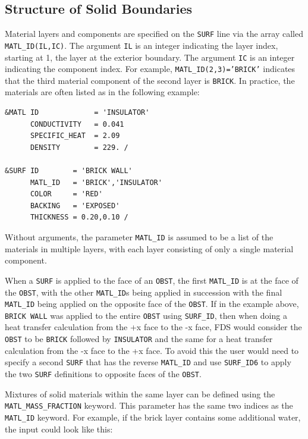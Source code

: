 \documentclass[11pt]{book}
\newcommand{\ct}{\tt\small}
\begin{document}
\subsection{Structure of Solid Boundaries}

Material layers and components are
specified on the {\ct SURF} line via the array called {\ct MATL\_ID(IL,IC)}.
The argument {\ct IL} is an integer indicating the
layer index, starting at 1, the layer at the exterior boundary. The
argument {\ct IC} is an integer indicating the component index. For
example, {\ct MATL\_ID(2,3)='BRICK'} indicates that the third material
component of the second layer is {\ct BRICK}. In practice, the
materials are often listed as in the following example:

\footnotesize
\begin{verbatim}
&MATL ID             = 'INSULATOR'
      CONDUCTIVITY   = 0.041
      SPECIFIC_HEAT  = 2.09
      DENSITY        = 229. /

&SURF ID        = 'BRICK WALL'
      MATL_ID   = 'BRICK','INSULATOR'
      COLOR     = 'RED'
      BACKING   = 'EXPOSED'
      THICKNESS = 0.20,0.10 /

\end{verbatim}
\normalsize

\noindent
Without arguments, the parameter {\ct MATL\_ID} is assumed to be a list of the materials in multiple layers,
with each layer consisting of only a single
material component.

\begin{warning}
\noindent
When a {\ct SURF} is applied to the face of an {\ct OBST}, the first {\ct MATL\_ID} is at the face of the {\ct OBST}, with the
other {\ct MATL\_ID}s being applied in succession with the final {\ct MATL\_ID} being applied on the opposite face of the {\ct OBST}.
If in the example above, {\ct BRICK WALL} was applied to the entire {\ct OBST} using {\ct SURF\_ID}, then when doing a heat transfer calculation
from the +x face to the -x face, FDS would consider the {\ct OBST} to be {\ct BRICK} followed by {\ct INSULATOR} and the same for a heat transfer
calculation from the -x face to the +x face.  To avoid this the user would need to specify a second {\ct SURF} that has the reverse {\ct MATL\_ID}
and use {\ct SURF\_ID6} to apply the two {\ct SURF} definitions to opposite faces of the {\ct OBST}.
\end{warning}


Mixtures of solid materials within the same layer can be defined using
the {\ct MATL\_MASS\_FRACTION} keyword. This parameter has the same
two indices as the {\ct MATL\_ID} keyword. For example, if the
brick layer contains some additional water, the input could look like this:
\end{document}
